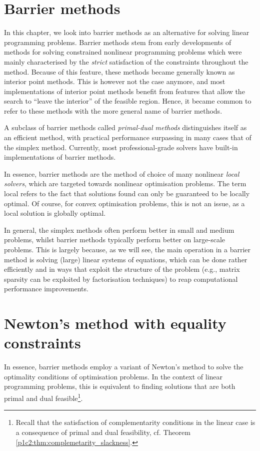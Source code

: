 \section{Barrier methods} \label{section_71}

In this chapter, we look into barrier methods as an alternative for solving linear programming problems. Barrier methods stem from early developments of methods for solving constrained nonlinear programming problems which were mainly characterised by the \emph{strict} satisfaction of the constraints throughout the method. Because of this feature, these methods became generally known as interior point methods. This is however not the case anymore, and most implementations of interior point methods benefit from features that allow the search to ``leave the interior'' of the feasible region. Hence, it became common to refer to these methods with the more general name of barrier methods.

A subclass of barrier methods called \emph{primal-dual methods} distinguishes itself as an efficient method, with practical performance surpassing in many cases that of the simplex method. Currently, most professional-grade solvers have built-in implementations of barrier methods.

In essence, barrier methods are the method of choice of many nonlinear \emph{local solvers}, which are targeted towards nonlinear optimisation problems. The term local refers to the fact that solutions found can only be guaranteed to be locally optimal. Of course, for convex optimisation problems, this is not an issue, as a local solution is globally optimal.

In general, the simplex methods often perform better in small and medium problems, whilst barrier methods typically perform better on large-scale problems. This is largely because, as we will see, the main operation in a barrier method is solving (large) linear systems of equations, which can be done rather efficiently and in ways that exploit the structure of the problem (e.g., matrix sparsity can be exploited by factorisation techniques) to reap computational performance improvements.


\section{Newton's method with equality constraints} 


In essence, barrier methods employ a variant of Newton's method to solve the optimality conditions of optimisation problems. In the context of linear programming problems, this is equivalent to finding solutions that are both primal and dual feasible\footnote{Recall that the satisfaction of complementarity conditions in the linear case is a consequence of primal and dual feasibility, cf. Theorem \ref{p1c2:thm:complemetarity_slackness}.}.

